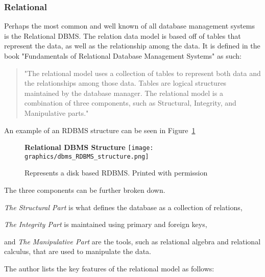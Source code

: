 \documentclass[letterpaper, 12pt]{article}
\begin{document}
\subsubsection{Relational}
Perhaps the most common and well known of all database management systems is the
Relational DBMS. The relation data model is based off of tables that represent
the data, as well as the relationship among the data. It is defined in the book
"Fundamentals of Relational Database Management Systems" as such:
\begin{quote}
"The relational model uses a collection of tables to represent both data and
the relationships among those data. Tables are logical structures maintained
by the database manager. The relational model is a combination of three
components, such as Structural, Integrity, and Manipulative parts."
\cite{sumathi2007fundamentals}
\end{quote}
\par\vspace{\baselineskip}
An example of an RDBMS structure can be seen in Figure~\ref{fig:RDBMS_structure}
\begin{figure}
  \centering
  \label{fig:RDBMS_structure}
  \textbf{Relational DBMS Structure}
  \texttt{[image: graphics/dbms\_RDBMS\_structure.png]}
  \caption{Represents a disk based RDBMS. Printed with permission \cite{wikiRDBMS}}
\end{figure}
The three components can be further broken down.
\par\vspace{\baselineskip}
\textit{The Structural Part} is what defines the database as a collection of relations,
\par\vspace{\baselineskip}
\textit{The Integrity Part} is maintained using primary and foreign keys,
\par\vspace{\baselineskip}and
\textit{The Manipulative Part} are the tools, such as relational algebra and
relational calculus, that are used to manipulate the data.
\par\vspace{\baselineskip}
The author lists the key features of the relational model as follows:
\end{document}
